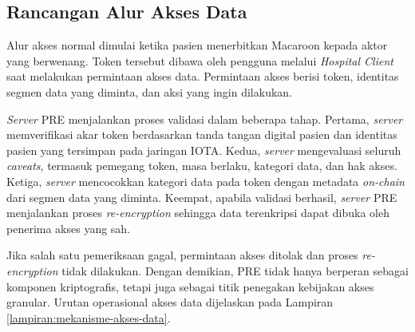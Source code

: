 \subsection{Rancangan Alur Akses Data}
\label{subsec:rancangan-alur-akses-data}

Alur akses normal dimulai ketika pasien menerbitkan Macaroon kepada aktor yang berwenang. Token tersebut dibawa oleh pengguna melalui \textit{Hospital Client} saat melakukan permintaan akses data. Permintaan akses berisi token, identitas segmen data yang diminta, dan aksi yang ingin dilakukan.

\textit{Server} PRE menjalankan proses validasi dalam beberapa tahap. Pertama, \textit{server} memverifikasi akar token berdasarkan tanda tangan digital pasien dan identitas pasien yang tersimpan pada jaringan IOTA. Kedua, \textit{server} mengevaluasi seluruh \textit{caveats}, termasuk pemegang token, masa berlaku, kategori data, dan hak akses. Ketiga, \textit{server} mencocokkan kategori data pada token dengan metadata \textit{on-chain} dari segmen data yang diminta. Keempat, apabila validasi berhasil, \textit{server} PRE menjalankan proses \textit{re-encryption} sehingga data terenkripsi dapat dibuka oleh penerima akses yang sah.

Jika salah satu pemeriksaan gagal, permintaan akses ditolak dan proses \textit{re-encryption} tidak dilakukan. Dengan demikian, PRE tidak hanya berperan sebagai komponen kriptografis, tetapi juga sebagai titik penegakan kebijakan akses granular. Urutan operasional akses data dijelaskan pada Lampiran \ref{lampiran:mekanisme-akses-data}.

